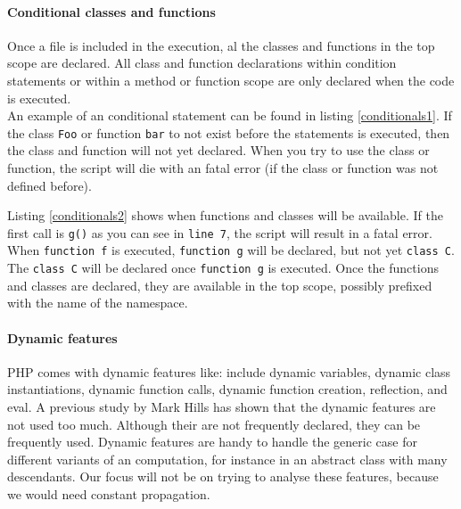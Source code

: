 \documentclass[../main.tex]{subfiles}
\begin{document}
    \paragraph{Conditional classes and functions}
    Once a file is included in the execution, al the classes and functions in the top scope are declared.
    All class and function declarations within condition statements or within a method or function scope are only declared when the code is executed.
    \\
    An example of an conditional statement can be found in listing \ref{conditionals1}.
    If the class \texttt{Foo} or function \texttt{bar} to not exist before the statements is executed, then the class and function will not yet declared. 
    When you try to use the class or function, the script will die with an fatal error (if the class or function was not defined before).

    

    Listing \ref{conditionals2} shows when functions and classes will be available.
    If the first call is \texttt{g()} as you can see in \texttt{line 7}, the script will result in a fatal error.
    When \texttt{function f} is executed, \texttt{function g} will be declared, but not yet \texttt{class C}.
    The \texttt{class C} will be declared once \texttt{function g} is executed.
    Once the functions and classes are declared, they are available in the top scope, possibly prefixed with the name of the namespace.
    

    
    \paragraph{Dynamic features}
    PHP comes with dynamic features like: include dynamic variables, dynamic class instantiations, dynamic function calls, dynamic function creation, reflection, and eval.
    A previous study by Mark Hills\cite{Hil:13} has shown that the dynamic features are not used too much.
    Although their are not frequently declared, they can be frequently used.
    Dynamic features are handy to handle the generic case for different variants of an computation, for instance in an abstract class with many descendants.
    Our focus will not be on trying to analyse these features, because we would need constant propagation.
    
\end{document}
